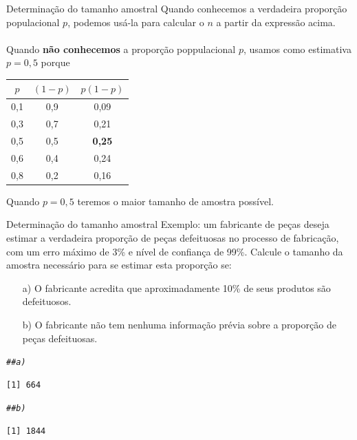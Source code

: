 \documentclass[10pt]{beamer}\usepackage[]{graphicx}\usepackage[]{color}
\makeatletter
\newcommand{\hlcom}[1]{\textcolor[rgb]{0.678,0.584,0.686}{\textit{#1}}}%
\newenvironment{kframe}{%
 \def\at@end@of@kframe{}%
 \ifinner\ifhmode%
  \def\at@end@of@kframe{\end{minipage}}%
  \begin{minipage}{\columnwidth}%
 \fi\fi%
 \def\FrameCommand##1{\hskip\@totalleftmargin \hskip-\fboxsep
 \colorbox{shadecolor}{##1}\hskip-\fboxsep
     \hskip-\linewidth \hskip-\@totalleftmargin \hskip\columnwidth}%
 \MakeFramed {\advance\hsize-\width
   \@totalleftmargin\z@ \linewidth\hsize
   \@setminipage}}%
 {\par\unskip\endMakeFramed%
 \at@end@of@kframe}
\newenvironment{knitrout}{}{} %
\theoremstyle{definition}
\makeatother
\begin{document}
\begin{frame}{Determinação do tamanho amostral}
  Quando conhecemos a verdadeira proporção populacional $p$, podemos
  usá-la para calcular o $n$ a partir da expressão acima. \\~\\
  Quando \textbf{não conhecemos} a proporção poppulacional $p$, usamos
  como estimativa $p=0,5$ porque
  \begin{table}[h]
    \centering
    \begin{tabular}{ccc}
      \hline
      $p$ & $(1-p)$ & $p(1-p)$ \\
      \hline
      0,1 & 0,9 & 0,09 \\
      0,3 & 0,7 & 0,21 \\
      0,5 & 0,5 & \textbf{0,25} \\
      0,6 & 0,4 & 0,24 \\
      0,8 & 0,2 & 0,16 \\
      \hline
    \end{tabular}
  \end{table}
  Quando $p=0,5$ teremos o maior tamanho de amostra possível.
\end{frame}

\begin{frame}[fragile]{Determinação do tamanho amostral}
  Exemplo: um fabricante de peças deseja estimar a verdadeira
  proporção de peças defeituosas no processo de fabricação, com um erro
  máximo de 3\% e nível de confiança de 99\%. Calcule o tamanho da
  amostra necessário para se estimar esta proporção se:
  \begin{itemize}
  \item[a)] O fabricante acredita que aproximadamente 10\% de seus produtos
    são defeituosos.
  \item[b)] O fabricante não tem nenhuma informação prévia sobre a proporção
    de peças defeituosas.
  \end{itemize}
\begin{knitrout}\footnotesize
{}\color{fgcolor}\begin{kframe}
\begin{alltt}
\hlcom{## a)}
\end{alltt}
\begin{verbatim}
[1] 664
\end{verbatim}
\begin{alltt}
\hlcom{## b)}
\end{alltt}
\begin{verbatim}
[1] 1844
\end{verbatim}
\end{kframe}
\end{knitrout}
\end{frame}
\end{document}
